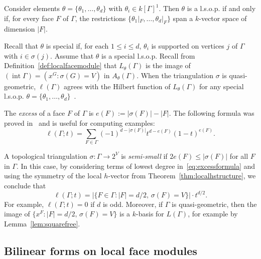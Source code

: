 \begin{lemm}\label{lem:Stanleycriterion}\cite[Lemma III.2.4]{Stanleybook}
	Consider elements $ \theta = \{ \theta_1,\ldots,\theta_d \}$ with $\theta_i \in k[\Gamma]^1$. Then $\theta$ is a l.s.o.p. if and only if, for every face $F$ of $\Gamma$, the restrictions $\{ \theta_1|_F,\ldots,\theta_d|_F \}$ span a $k$-vector space of dimension $|F|$. 
\end{lemm}

Recall  that $\theta$ is special if, for each $1 \le i \le d$, $\theta_i$ is supported on vertices $j$ of $\Gamma$ with $i \in \sigma(j)$. Assume that $\theta$ is a special l.s.o.p. Recall from Definition~\ref{def:localfacemodule} that $L_\theta(\Gamma)$ is the image of $(\operatorname{int} \Gamma) = (x^G : \sigma(G) = V)$ in
$A_{\theta}(\Gamma)$. 
When the triangulation $\sigma$ is quasi-geometric, $\ell(\Gamma)$ agrees with the Hilbert function of $L_{\theta}(\Gamma)$ for any special l.s.o.p. $\theta = \{ \theta_1, \dotsc, \theta_d \}$~\cite[Theorem 4.6]{Stanleylocalh}. 

The \emph{excess}  of a face $F$ of $\Gamma$ is $e(F) := |\sigma(F)| - |F|$. 
The following formula was proved in~\cite[Proposition~2.2]{Stanleylocalh} and is useful for computing examples:
\begin{equation}\label{eq:excessformula}
	\ell(\Gamma;t) = \sum_{F \in \Gamma} (-1)^{d - |\sigma(F)|} t^{d - e(F)} (1 - t)^{e(F)}. 
\end{equation}

\begin{example}\label{ex:semismall}
	A topological triangulation $\sigma \colon \Gamma \to 2^V$ is \emph{semi-small} if
	$2e(F) \le |\sigma(F)|$ for all $F$ in $\Gamma$. In this case, by considering terms of lowest degree in~\eqref{eq:excessformula} and using the symmetry of the local $h$-vector from Theorem~\ref{thm:localhstructure}, we conclude that 
	\[\ell(\Gamma;t) = |\{ F \in \Gamma : |F| = d/2, \, \sigma(F) = V\}| \cdot t^{d/2}.\]
For example,  $\ell(\Gamma; t) = 0$ if $d$ is odd.
	Moreover, if $\Gamma$ is quasi-geometric, then the image of $\{ x^F : |F| = d/2, \, \sigma(F) = V \}$ is a $k$-basis for $L(\Gamma)$, for example by Lemma~\ref{lem:squarefree}. 
\end{example}

\subsection{Bilinear forms on local face modules}\label{ssec:bilinear}

